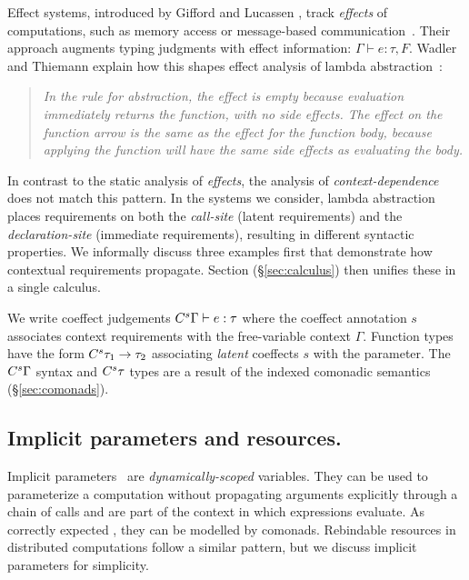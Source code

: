 Effect systems, introduced by Gifford and Lucassen
\cite{effects-gifford}, track \emph{effects} of computations, such as
memory access or message-based
communication~\cite{effects-messagepassing}. Their approach augments
typing judgments with effect information: $\Gamma \vdash e :
\tau, F$.  Wadler and Thiemann explain how this shapes
effect analysis of lambda abstraction~\cite{monads-effects-marriage}:
%
\begin{quote}
\emph{In the rule for abstraction, the effect is empty because evaluation immediately
returns the function, with no side effects. The effect on the function arrow
is the same as the effect for the function body, because applying the function will
have the same side effects as evaluating the body.}
\end{quote}
%
In contrast to the static analysis of \emph{effects}, the analysis of \emph{context-dependence} 
does not match this pattern. In the systems we consider, lambda abstraction places 
requirements on both the \emph{call-site} (latent requirements) and the \emph{declaration-site} 
(immediate requirements), resulting in different syntactic properties. 
We informally discuss three examples first that demonstrate how contextual
requirements propagate. Section (\S\ref{sec:calculus}) then unifies these 
in a single calculus.

We write coeffect judgements $C^{s}\Gamma \vdash e : \tau$ where the 
coeffect annotation $s$ associates context requirements with the 
free-variable context $\Gamma$. Function types have the form $C^{s}\tau_1 \rightarrow \tau_2$ associating
\emph{latent} coeffects $s$ with the parameter.
The $C^{s}\Gamma$ syntax and $C^{s}\tau$ types are a result of the
indexed comonadic semantics (\S\ref{sec:comonads}).

\vspace{-1em}
\subsection{Implicit parameters and resources.}
\label{sec:coeffects-res}

Implicit parameters~\cite{app-implicit-parameters} are \emph{dynamically-scoped} variables.
They can be used to parameterize a computation without propagating arguments explicitly through a 
chain of calls and are part of the context in which expressions evaluate. As correctly expected
\cite{app-implicit-parameters}, they can be modelled by comonads. Rebindable resources in distributed
computations follow a similar pattern, but we discuss implicit parameters for simplicity.

